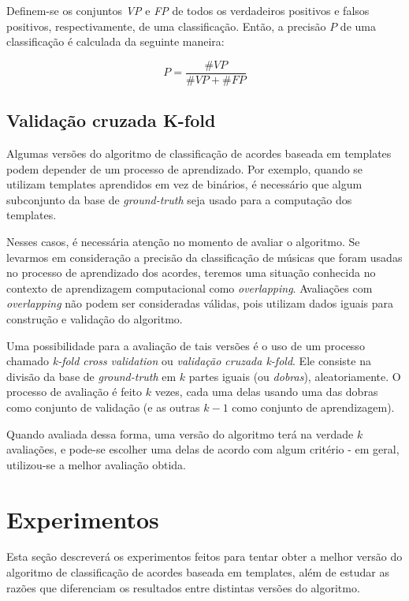         Definem-se os conjuntos \textit{VP} e \textit{FP} de todos os verdadeiros positivos e falsos positivos, respectivamente, de uma classificação. Então, a precisão $P$ de uma classificação é calculada da seguinte maneira:
        
        \[
            P = \frac{\#VP}{\#VP + \#FP}
        \]
    
    \subsection{Validação cruzada K-fold}
        Algumas versões do algoritmo de classificação de acordes baseada em templates podem depender de um processo de aprendizado. Por exemplo, quando se utilizam templates aprendidos em vez de binários, é necessário que algum subconjunto da base de \textit{ground-truth} seja usado para a computação dos templates.
        
        Nesses casos, é necessária atenção no momento de avaliar o algoritmo. Se levarmos em consideração a precisão da classificação de músicas que foram usadas no processo de aprendizado dos acordes, teremos uma situação conhecida no contexto de aprendizagem computacional como \textit{overlapping}. Avaliações com \textit{overlapping} não podem ser consideradas válidas, pois utilizam dados iguais para construção e validação do algoritmo.
        
        Uma possibilidade para a avaliação de tais versões é o uso de um processo chamado \textit{k-fold cross validation} ou \textit{validação cruzada k-fold}. Ele consiste na divisão da base de \textit{ground-truth} em $k$ partes iguais (ou \textit{dobras}), aleatoriamente. O processo de avaliação é feito $k$ vezes, cada uma delas usando uma das dobras como conjunto de validação (e as outras $k - 1$ como conjunto de aprendizagem).
        
        Quando avaliada dessa forma, uma versão do algoritmo terá na verdade $k$ avaliações, e pode-se escolher uma delas de acordo com algum critério - em geral, utilizou-se a melhor avaliação obtida. 


\section{Experimentos}

    Esta seção descreverá os experimentos feitos para tentar obter a melhor versão do algoritmo de classificação de acordes baseada em templates, além de estudar as razões que diferenciam os resultados entre distintas versões do algoritmo.
    
